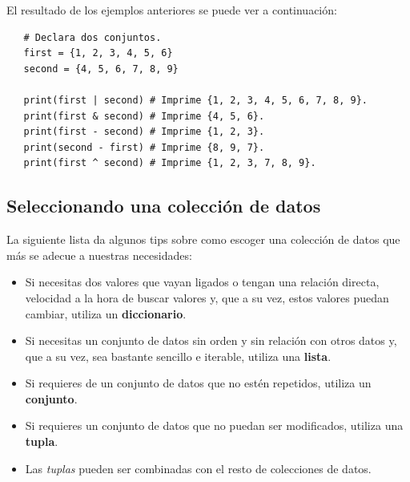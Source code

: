 El resultado de los ejemplos anteriores se puede ver a continuación:
\begin{lstlisting}
   # Declara dos conjuntos.
   first = {1, 2, 3, 4, 5, 6}
   second = {4, 5, 6, 7, 8, 9}

   print(first | second) # Imprime {1, 2, 3, 4, 5, 6, 7, 8, 9}.
   print(first & second) # Imprime {4, 5, 6}.
   print(first - second) # Imprime {1, 2, 3}.
   print(second - first) # Imprime {8, 9, 7}.
   print(first ^ second) # Imprime {1, 2, 3, 7, 8, 9}.
\end{lstlisting}


\subsection{Seleccionando una colección de datos}
\hspace{0.55cm}La siguiente lista da algunos tips sobre como escoger una colección de datos que más se adecue a nuestras necesidades:
\begin{itemize}
	\item Si necesitas dos valores que vayan ligados o tengan una relación directa, velocidad a la hora de buscar valores y, que a su vez, estos valores puedan cambiar, utiliza un \textbf{diccionario}.
	\item Si necesitas un conjunto de datos sin orden y sin relación con otros datos y, que a su vez, sea bastante sencillo e iterable, utiliza una \textbf{lista}.
	\item Si requieres de un conjunto de datos que no estén repetidos, utiliza un \textbf{conjunto}.
	\item Si requieres un conjunto de datos que no puedan ser modificados, utiliza una \textbf{tupla}.
	\item Las \textit{tuplas} pueden ser combinadas con el resto de colecciones de datos.
\end{itemize}